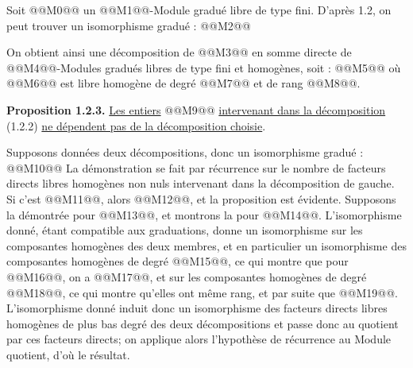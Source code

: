 
Soit @@M0@@ un @@M1@@-Module gradué libre de type fini. D'après 1.2, on peut trouver un isomorphisme gradué :
@@M2@@

On obtient ainsi une décomposition de @@M3@@ en somme directe de @@M4@@-Modules gradués libres de type fini et homogènes, soit :
@@M5@@
où @@M6@@ est libre homogène de degré @@M7@@ et de rang @@M8@@.

\textbf{Proposition 1.2.3.} \uline{Les entiers} @@M9@@ \uline{intervenant dans la décomposition} (1.2.2) \uline{ne dépendent pas de la décomposition choisie}.

Supposons données deux décompositions, donc un isomorphisme gradué :
@@M10@@
La démonstration se fait par récurrence sur le nombre de facteurs directs libres homogènes non nuls intervenant dans la décomposition de gauche. Si c'est @@M11@@, alors @@M12@@, et la proposition est évidente. Supposons la démontrée pour @@M13@@, et montrons la pour @@M14@@. L'isomorphisme donné, étant compatible aux graduations, donne un isomorphisme sur les composantes homogènes des deux membres, et en particulier un isomorphisme des composantes homogènes de degré @@M15@@, ce qui montre que pour @@M16@@, on a @@M17@@, et sur les composantes homogènes de degré @@M18@@, ce qui montre qu'elles ont même rang, et par suite que @@M19@@. L'isomorphisme donné induit donc un isomorphisme des facteurs directs libres homogènes de plus bas degré des deux décompositions et passe donc au quotient par ces facteurs directs; on applique alors l'hypothèse de récurrence au Module quotient, d'où le résultat.

